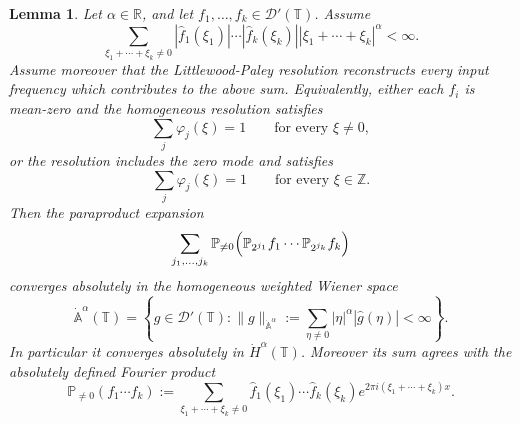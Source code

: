 \documentclass[12pt,reqno,letterpaper]{amsart}
\numberwithin{equation}{section}
\newcommand{\1}{{\bf 1}}
\newcommand{\2}{{\bf 2}}
\newcommand{\T}{\mathbb T}
\newtheorem{lemma}[theorem]{Lemma}
\theoremstyle{remark}
\theoremstyle{remark}
\begin{document}
\begin{lemma}
\label{lem:absolute-implies-paraproduct}
Let $\alpha\in\mathbb R$, and let $f_1,\ldots,f_k\in\mathcal D'(\T)$.
Assume
\begin{equation*}
\sum_{\xi_1+\cdots+\xi_k\neq0}
|\hat{f}_1(\xi_1)|\cdots|\hat{f}_k(\xi_k)|
|\xi_1+\cdots+\xi_k|^\alpha
<\infty .
\end{equation*}
Assume moreover that the Littlewood-Paley resolution reconstructs every
input frequency which contributes to the above sum. Equivalently, either each
$f_i$ is mean-zero and the homogeneous resolution satisfies
\[
\sum_j \varphi_j(\xi)=1
\qquad\text{for every }\xi\neq0,
\]
or the resolution includes the zero mode and satisfies
\[
\sum_j \varphi_j(\xi)=1
\qquad\text{for every }\xi\in\mathbb Z.
\]
Then the paraproduct expansion
\begin{equation*}
\sum_{j_1,\ldots,j_k}
\mathbb P_{\neq0}\Bigl(
\mathbb P_{2^{j_1}}f_1\cdots \mathbb P_{2^{j_k}}f_k
\Bigr)
\end{equation*}
converges absolutely in the homogeneous weighted Wiener space
\[
\dot{\mathbb{A}}^\alpha(\T)
=
\left\{
g\in\mathcal D'(\T):
\|g\|_{\dot{\mathbb{A}}^\alpha}
:=
\sum_{\eta\neq0}|\eta|^\alpha|\hat{g}(\eta)|<\infty
\right\}.
\]
In particular it converges absolutely in $\dot H^\alpha(\T)$. Moreover its
sum agrees with the absolutely defined Fourier product
\begin{equation*}
\mathbb P_{\neq0}(f_1\cdots f_k)
:=
\sum_{\xi_1+\cdots+\xi_k\neq0}
\hat{f}_1(\xi_1)\cdots\hat{f}_k(\xi_k)
e^{2\pi i(\xi_1+\cdots+\xi_k)x}.
\end{equation*}
\end{lemma}
\end{document}
